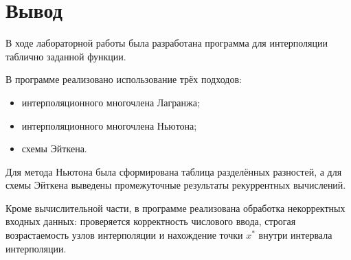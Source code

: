 \documentclass[12pt,a4paper]{article}
\begin{document}
\section{Вывод}

В ходе лабораторной работы была разработана программа для
интерполяции таблично заданной функции.

В программе реализовано использование трёх подходов:

\begin{itemize}
    \item интерполяционного многочлена Лагранжа;
    \item интерполяционного многочлена Ньютона;
    \item схемы Эйткена.
\end{itemize}

Для метода Ньютона была сформирована таблица разделённых
разностей, а для схемы Эйткена выведены промежуточные результаты
рекуррентных вычислений.

Кроме вычислительной части, в программе реализована обработка
некорректных входных данных: проверяется корректность числового
ввода, строгая возрастаемость узлов интерполяции и нахождение
точки $x^*$ внутри интервала интерполяции.
\end{document}
